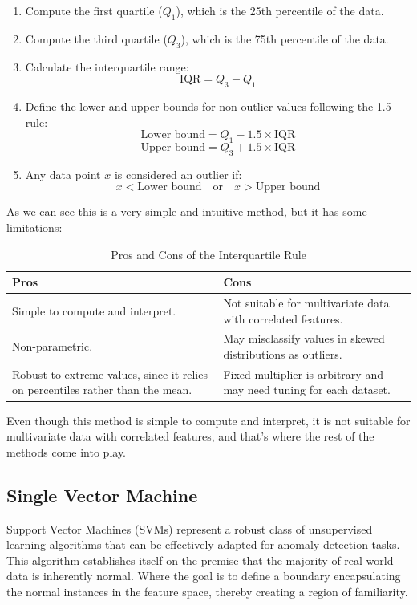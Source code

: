 \documentclass[11pt,english,a4paper,hidelinks]{book}
\begin{document}
\begin{enumerate}
    \item Compute the first quartile ($Q_1$), which is the 25th percentile of the data.
    \item Compute the third quartile ($Q_3$), which is the 75th percentile of the data.
    \item Calculate the interquartile range:
    \[
        \text{IQR} = Q_3 - Q_1
    \]
    \item Define the lower and upper bounds for non-outlier values following the 1.5 rule:
    \[
        \text{Lower bound} = Q_1 - 1.5 \times \text{IQR}
    \]
    \[
        \text{Upper bound} = Q_3 + 1.5 \times \text{IQR}
    \]
    \item Any data point $x$ is considered an outlier if:
    \[
        x < \text{Lower bound} \quad \text{or} \quad x > \text{Upper bound}
    \]
\end{enumerate}

\noindent As we can see this is a very simple and intuitive method, but it has some limitations:

\begin{table}[H]
    \centering
    \begin{tabular}{|p{7cm}|p{7cm}|}
    \hline
    \textbf{Pros} & \textbf{Cons} \\
    \hline
    Simple to compute and interpret. & Not suitable for multivariate data with correlated features. \\
    \hline
    Non-parametric. & May misclassify values in skewed distributions as outliers. \\
    \hline
    Robust to extreme values, since it relies on percentiles rather than the mean. & Fixed multiplier is arbitrary and may need tuning for each dataset. \\
    \hline
    \end{tabular}
    \caption{Pros and Cons of the Interquartile Rule}
\end{table}

\noindent Even though this method is simple to compute and interpret, it is not suitable for multivariate data with correlated features, and that's where the rest of the methods come into play.

\subsection{Single Vector Machine}

\noindent Support Vector Machines (SVMs) represent a robust class of unsupervised learning algorithms that can be effectively adapted for anomaly detection tasks. This algorithm establishes itself on the premise that the majority of real-world data is inherently normal. Where the goal is to define a boundary encapsulating the normal instances in the feature space, thereby creating a region of familiarity. 
\end{document}
